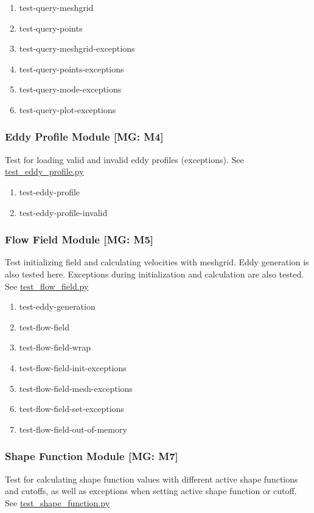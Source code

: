 \documentclass[12pt, titlepage]{article}
\begin{document}
\begin{enumerate}
  \item test-query-meshgrid
  \item test-query-points
  \item test-query-meshgrid-exceptions
  \item test-query-points-exceptions
  \item test-query-mode-exceptions
  \item test-query-plot-exceptions
\end{enumerate}

\subsubsection{Eddy Profile Module [MG: M4]} \label{UT:Prof}
Test for loading valid and invalid eddy profiles (exceptions). See \href{https://github.com/omltcat/turbulent-flow/blob/main/test/test_eddy_profile.py}{test\_eddy\_profile.py}

\begin{enumerate}
  \item test-eddy-profile
  \item test-eddy-profile-invalid
\end{enumerate}

\subsubsection{Flow Field Module [MG: M5]} \label{UT:Field}
Test initializing field and calculating velocities with meshgrid. Eddy generation is also tested here. Exceptions during initialization and calculation are also tested. See \href{https://github.com/omltcat/turbulent-flow/blob/main/test/test_flow_field.py}{test\_flow\_field.py}

\begin{enumerate}
  \item test-eddy-generation
  \item test-flow-field
  \item test-flow-field-wrap
  \item test-flow-field-init-exceptions
  \item test-flow-field-mesh-exceptions
  \item test-flow-field-set-exceptions
  \item test-flow-field-out-of-memory
\end{enumerate}

\subsubsection{Shape Function Module [MG: M7]} \label{UT:Shape}
Test for calculating shape function values with different active shape functions and cutoffs, as well as exceptions when setting active shape function or cutoff. See \href{https://github.com/omltcat/turbulent-flow/blob/main/test/test_shape_function.py}{test\_shape\_function.py}
\end{document}

